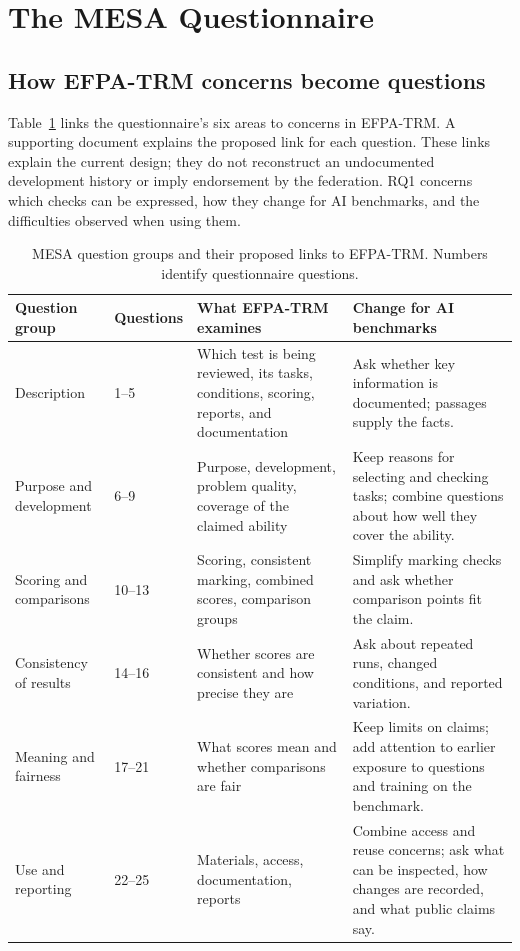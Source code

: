 \documentclass[10pt,conference]{IEEEtran}
\begin{document}
\section{The MESA Questionnaire}
\subsection{How EFPA-TRM concerns become questions}
Table~\ref{tab:domains} links the questionnaire's six areas to concerns in EFPA-TRM. A supporting document explains the proposed link for each question. These links explain the current design; they do not reconstruct an undocumented development history or imply endorsement by the federation. RQ1 concerns which checks can be expressed, how they change for AI benchmarks, and the difficulties observed when using them.

\begin{table}[t]
\caption{MESA question groups and their proposed links to EFPA-TRM. Numbers identify questionnaire questions.}
\label{tab:domains}
\small
\begin{tabularx}{\textwidth}{@{}p{}p{}XX@{}}
\toprule
Question group & Questions & What EFPA-TRM examines & Change for AI benchmarks \\
\midrule
Description & 1--5 & Which test is being reviewed, its tasks, conditions, scoring, reports, and documentation & Ask whether key information is documented; passages supply the facts. \\
Purpose and development & 6--9 & Purpose, development, problem quality, coverage of the claimed ability & Keep reasons for selecting and checking tasks; combine questions about how well they cover the ability. \\
Scoring and comparisons & 10--13 & Scoring, consistent marking, combined scores, comparison groups & Simplify marking checks and ask whether comparison points fit the claim. \\
Consistency of results & 14--16 & Whether scores are consistent and how precise they are & Ask about repeated runs, changed conditions, and reported variation. \\
Meaning and fairness & 17--21 & What scores mean and whether comparisons are fair & Keep limits on claims; add attention to earlier exposure to questions and training on the benchmark. \\
Use and reporting & 22--25 & Materials, access, documentation, reports & Combine access and reuse concerns; ask what can be inspected, how changes are recorded, and what public claims say. \\
\bottomrule
\end{tabularx}
\end{table}
\end{document}
